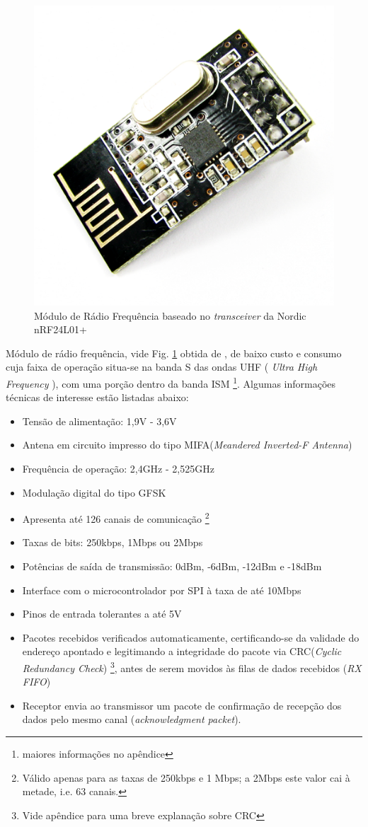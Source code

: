   \begin{figure}[!htb] %
    \centering
    \includegraphics[width=0.5\linewidth]{../../Imagens/nordicc.png}
    \caption{Módulo de Rádio Frequência baseado no \textit{transceiver} da Nordic nRF24L01+}
    \label{Nordic}
  \end{figure}
Módulo de rádio frequência, vide  Fig. \ref{Nordic} obtida de , de baixo custo e consumo cuja faixa de operação situa-se na 
banda S das ondas UHF ( \textit{Ultra 
High Frequency} ), com uma porção dentro da banda ISM \footnote{maiores informações no apêndice}.
Algumas informações técnicas \cite{nRF} de interesse estão listadas abaixo: 
\begin{itemize}
 \item Tensão de alimentação: 1,9V - 3,6V
 \item Antena em circuito impresso do tipo MIFA(\textit{Meandered Inverted-F Antenna}) \cite{MIFA}
 \item Frequência de operação: 2,4GHz - 2,525GHz
 \item Modulação digital do tipo GFSK 
 \item Apresenta até 126 canais de comunicação \footnote{Válido apenas para as taxas de 250kbps e 1 Mbps; a 2Mbps este valor cai à metade, i.e. 63 
canais.}
 \item Taxas de bits: 250kbps, 1Mbps ou 2Mbps
 \item Potências de saída de transmissão: 0dBm, -6dBm, -12dBm e -18dBm
 \item Interface com o microcontrolador por SPI à taxa de até 10Mbps
 \item Pinos de entrada tolerantes a até 5V
 \item 
Pacotes recebidos verificados automaticamente, certificando-se da validade do endereço apontado e legitimando a integridade 
do pacote via CRC(\textit{Cyclic Redundancy Check}) \footnote{Vide apêndice para uma breve explanação sobre CRC}, antes de 
serem movidos às filas de dados recebidos (\textit{RX FIFO})
 \item Receptor envia ao transmissor um pacote de confirmação de recepção dos dados pelo mesmo canal (\textit{acknowledgment packet}).
\end{itemize}

